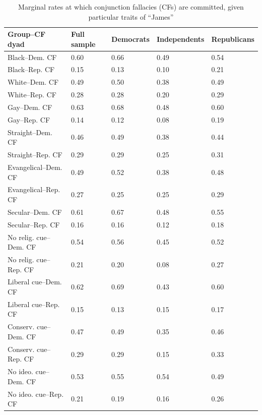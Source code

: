 \documentclass[12pt, letterpaper]{article}
\begin{document}
\begin{table}[]
\caption{Marginal rates at which conjunction fallacies (CFs) are committed, given particular traits of ``James''}
\begin{tabular}{|l|l|l|l|l|}
\hline
Group--CF dyad         & Full sample & Democrats & Independents & Republicans \\ \hline
Black--Dem. CF         & 0.60        & 0.66      & 0.49         & 0.54        \\ \hline
Black--Rep. CF         & 0.15        & 0.13      & 0.10         & 0.21        \\ \hline
White--Dem. CF         & 0.49        & 0.50      & 0.38         & 0.49        \\ \hline
White--Rep. CF         & 0.28        & 0.28      & 0.20         & 0.29        \\ \hline
Gay--Dem. CF           & 0.63        & 0.68      & 0.48         & 0.60        \\ \hline
Gay--Rep. CF           & 0.14        & 0.12      & 0.08         & 0.19        \\ \hline
Straight--Dem. CF      & 0.46        & 0.49      & 0.38         & 0.44        \\ \hline
Straight--Rep. CF      & 0.29        & 0.29      & 0.25         & 0.31        \\ \hline
Evangelical--Dem. CF   & 0.49        & 0.52      & 0.38         & 0.48        \\ \hline
Evangelical--Rep. CF   & 0.27        & 0.25      & 0.25         & 0.29        \\ \hline
Secular--Dem. CF       & 0.61        & 0.67      & 0.48         & 0.55        \\ \hline
Secular--Rep. CF       & 0.16        & 0.16      & 0.12         & 0.18        \\ \hline
No relig. cue--Dem. CF & 0.54        & 0.56      & 0.45         & 0.52        \\ \hline
No relig. cue--Rep. CF & 0.21        & 0.20      & 0.08         & 0.27        \\ \hline
Liberal cue--Dem. CF   & 0.62        & 0.69      & 0.43         & 0.60        \\ \hline
Liberal cue--Rep. CF   & 0.15        & 0.13      & 0.15         & 0.17        \\ \hline
Conserv. cue--Dem. CF  & 0.47        & 0.49      & 0.35         & 0.46        \\ \hline
Conserv. cue--Rep. CF  & 0.29        & 0.29      & 0.15         & 0.33        \\ \hline
No ideo. cue--Dem. CF  & 0.53        & 0.55      & 0.54         & 0.49        \\ \hline
No ideo. cue--Rep. CF  & 0.21        & 0.19      & 0.16         & 0.26        \\ \hline
\end{tabular}
\end{table}
\end{document}
